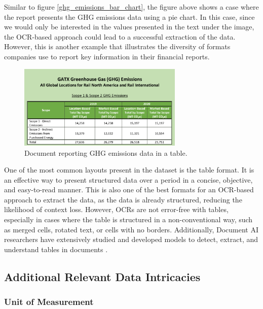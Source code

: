 \documentclass[english, 12pt, a4paper, elec, utf8, a-2b, online]{aaltothesis}
\begin{document}
Similar to figure \ref{ghg_emissions_bar_chart}, the figure above shows a case where the report presents the \ac{GHG} emissions data using a pie chart.
In this case, since we would only be interested in the values presented in the text under the image, the \ac{OCR}-based approach could lead to a successful extraction of the data.
However, this is another example that illustrates the diversity of formats companies use to report key information in their financial reports.

\begin{figure}[H]
    \centering
    \includegraphics[width=0.7\textwidth]{images/ghg_emissions_table.png}
    \caption{Document reporting \ac{GHG} emissions data in a table.}
    \label{ghg_emissions_table}
\end{figure}

One of the most common layouts present in the dataset is the table format.
It is an effective way to present structured data over a period in a concise, objective, and easy-to-read manner.
This is also one of the best formats for an \ac{OCR}-based approach to extract the data, as the data is already structured, reducing the likelihood of context loss.
However, \ac{OCR}s are not error-free with tables, especially in cases where the table is structured in a non-conventional way, such as merged cells, rotated text, or cells with no borders.
Additionally, Document \ac{AI} researchers have extensively studied and developed models to detect, extract, and understand tables in documents \cite{TableNet2020, table_extraction_conditional_pinto_2003, Schreiber2017, Li2022, Gilani2017, Shafait2010}.

\subsection{Additional Relevant Data Intricacies}

\subsubsection{Unit of Measurement}
\end{document}
